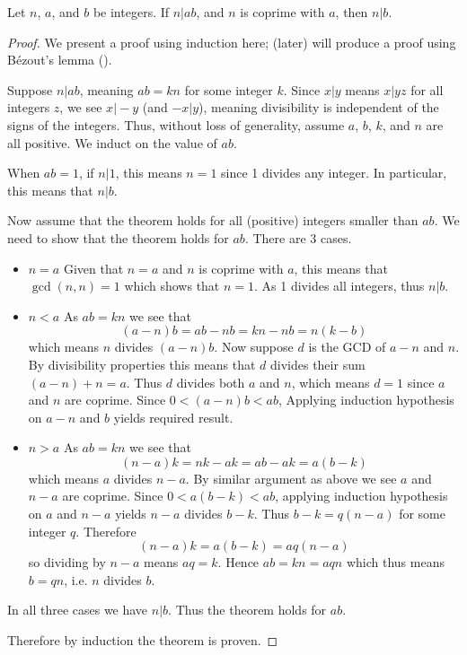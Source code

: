 \begin{theorem}\label{theorem-n-divides-ab-and-n-coprime-with-a-implies-n-divides-b}
    Let $n$, $a$, and $b$ be integers. If $n \vert ab$, and $n$ is coprime with $a$, then $n \vert b$.
\end{theorem}
\begin{proof}
    We present a proof using induction here;  (later) will produce a proof using B\'ezout's lemma ().

    Suppose $n \vert ab$, meaning $ab = kn$ for some integer $k$. Since $x\vert y$ means $x\vert yz$ for all integers $z$, we see $x \vert -y$ (and $-x \vert y$), meaning divisibility is independent of the signs of the integers. Thus, without loss of generality, assume $a$, $b$, $k$, and $n$ are all positive. We induct on the value of $ab$.

    When $ab = 1$, if $n \vert 1$, this means $n = 1$ since 1 divides any integer. In particular, this means that $n \vert b$.

    Now assume that the theorem holds for all (positive) integers smaller than $ab$. We need to show that the theorem holds for $ab$. There are 3 cases.
    \begin{itemize}
        \item $\boxed{n=a}$ Given that $n = a$ and $n$ is coprime with $a$, this means that $\gcd(n,n) = 1$ which shows that $n = 1$. As 1 divides all integers, thus $n \vert b$.

        \item $\boxed{n<a}$ As $ab = kn$ we see that
        \[
            (a-n)b = ab - nb = kn - nb = n(k-b)
        \]
        which means $n$ divides $(a-n)b$. Now suppose $d$ is the GCD of $a-n$ and $n$. By divisibility properties this means that $d$ divides their sum $(a-n)+n = a$. Thus $d$ divides both $a$ and $n$, which means $d = 1$ since $a$ and $n$ are coprime. Since $0 < (a-n)b < ab$, Applying induction hypothesis on $a-n$ and $b$ yields required result.

        \item $\boxed{n>a}$ As $ab = kn$ we see that
        \[
            (n-a)k = nk - ak = ab - ak = a(b-k)
        \]
        which means $a$ divides $n-a$. By similar argument as above we see $a$ and $n-a$ are coprime. Since $0 < a(b-k)<ab$, applying induction hypothesis on $a$ and $n-a$ yields $n-a$ divides $b-k$. Thus $b-k = q(n-a)$ for some integer $q$. Therefore
        \[
            (n-a)k = a(b-k) = aq(n-a)
        \]
        so dividing by $n-a$ means $aq = k$. Hence $ab = kn = aqn$ which thus means $b = qn$, i.e. $n$ divides $b$.
    \end{itemize}
    In all three cases we have $n \vert b$. Thus the theorem holds for $ab$.

    Therefore by induction the theorem is proven.
\end{proof}

